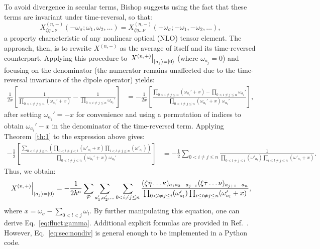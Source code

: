 \documentclass[12pt,a4paper]{article}
\begin{document}
To avoid divergence in secular terms, Bishop \cite{bishopExplicitNondivergentFormulas1994} suggests using the fact that these terms are invariant under time-reversal, so that:
\begin{equation*}
	X^{(n,-)}_{\zeta \eta \ldots \nu}(-\omega_\sigma; \omega_1, \omega_2, \ldots) = X^{(n,-)}_{\zeta \eta \ldots \nu}(+\omega_\sigma; -\omega_1, -\omega_2, \ldots),
\end{equation*}
a property characteristic of any nonlinear optical (NLO) tensor element. The approach, then, is to rewrite $X^{(n,-)}$ as the average of itself and its time-reversed counterpart. Applying this procedure to $\left. X^{(n,+)} \right|_{\ket{a_j} = \ket{0}}$ (where $\omega_{a_j} = 0$) and focusing on the denominator (the numerator remains unaffected due to the time-reversal invariance of the dipole operator) yields:
\begin{align*}
	\frac{1}{2x} \left[ \frac{1}{\prod_{0 < i \neq j \leq n} (\omega_{a_i}' + x)} - \frac{1}{\prod_{0 < i \neq j \leq n} \omega_{a_i}'} \right] 
	&= -\frac{1}{2x} \left[ \frac{\prod_{0 < i \neq j \leq n} (\omega_{a_i}' + x) - \prod_{0 < i \neq j \leq n} \omega_{a_i}'}{\prod_{0 < i \neq j \leq n} (\omega_{a_i}' + x) \, \omega_{a_i}'} \right],
\end{align*}
after setting $\omega_{a_j}' = -x$ for convenience and using a permutation of indices to obtain $\omega_{a_i}' - x$ in the denominator of the time-reversed term. Applying Theorem~\ref{th:1} to the expression above gives:
\begin{align*}
	-\frac{1}{2} \left[ \frac{\sum_{0 < i \neq j \leq n} \left( \prod_{0 < l \neq j < i} (\omega'_{a_l} + x) \prod_{i < l \neq j \leq n} (\omega'_{a_l}) \right)}{\prod_{0 < l \neq j \leq n} (\omega_{a_l}' + x) \, \omega_{a_l}'} \right] 
	&= -\frac{1}{2} \sum_{0 < i \neq j \leq n} \frac{1}{\prod_{0 < l \neq j \leq i} (\omega'_{a_l}) \prod_{i \leq l \neq j \leq n} (\omega'_{a_l} + x)}.
\end{align*}
Thus, we obtain:
\begin{equation}
	\left. X^{(n,+)} \right|_{\ket{a_j} = \ket{0}} = -\frac{1}{2\hbar^n} \sum_\mathcal{P} \sum_{a_1', a_2', \ldots} \sum_{0 < i \neq j \leq n} \frac{(\zeta \bar{\eta} \ldots \kappa)_{a_1 a_2 \ldots a_{j-1}} (\xi \bar{\tau} \ldots \nu)_{a_{j+1} \ldots a_n}}{\prod_{0 < l \neq j \leq i} (\omega'_{a_l}) \prod_{i \leq l \neq j \leq n} (\omega'_{a_l} + x)}, \label{eq:sec:nondiv}
\end{equation}
where $x = \omega_\sigma - \sum_{0 < l < j} \omega_l$. By further manipulating this equation, one can derive Eq.~\eqref{eq:fluct:gamma}. Additional explicit formulas are provided in Ref.~\cite{bishopExplicitNondivergentFormulas1994}. However, Eq.~\eqref{eq:sec:nondiv} is general enough to be implemented in a Python code.
\end{document}
